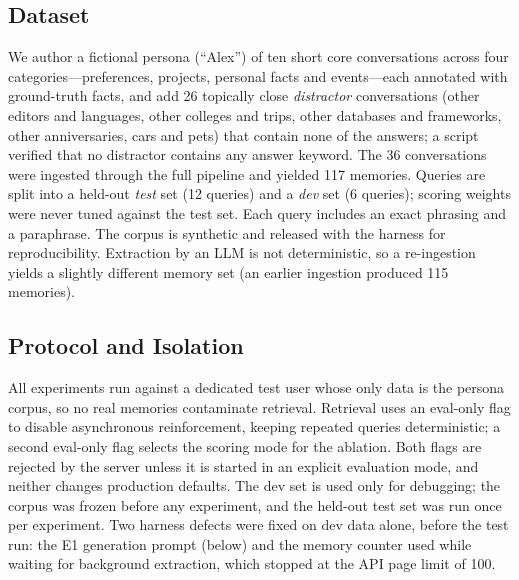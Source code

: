 \documentclass[conference]{IEEEtran}
\begin{document}
\subsection{Dataset}
We author a fictional persona (``Alex'') of ten short core conversations across
four categories---preferences, projects, personal facts and events---each
annotated with ground-truth facts, and add 26 topically close
\emph{distractor} conversations (other editors and languages, other colleges and
trips, other databases and frameworks, other anniversaries, cars and pets) that
contain none of the answers; a script verified that no distractor contains any
answer keyword. The 36 conversations were ingested through the full pipeline and
yielded 117 memories. Queries are split into a held-out \emph{test} set
(12 queries) and a \emph{dev} set (6 queries); scoring weights were never tuned
against the test set. Each query includes an exact phrasing and a paraphrase.
The corpus is synthetic and released with the harness for reproducibility.
Extraction by an LLM is not deterministic, so a re-ingestion yields a slightly
different memory set (an earlier ingestion produced 115 memories).

\subsection{Protocol and Isolation}
All experiments run against a dedicated test user whose only data is the persona
corpus, so no real memories contaminate retrieval. Retrieval uses an eval-only
flag to disable asynchronous reinforcement, keeping repeated queries
deterministic; a second eval-only flag selects the scoring mode for the
ablation. Both flags are rejected by the server unless it is started in an
explicit evaluation mode, and neither changes production defaults. The dev set
is used only for debugging; the corpus was frozen before any experiment, and the
held-out test set was run once per experiment. Two harness defects were fixed on
dev data alone, before the test run: the E1 generation prompt (below) and the
memory counter used while waiting for background extraction, which stopped at the
API page limit of 100.
\end{document}
